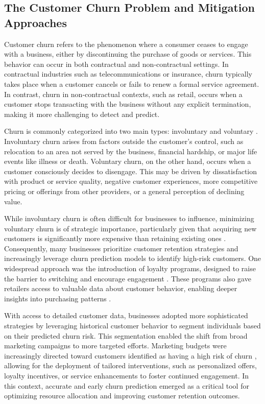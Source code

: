 \documentclass[preprint,12pt]{elsarticle}
\begin{document}
\subsection{The Customer Churn Problem and Mitigation Approaches}

Customer churn refers to the phenomenon where a consumer ceases to engage with a business, either by discontinuing the purchase of goods or services. This behavior can occur in both contractual and non-contractual settings. In contractual industries such as telecommunications or insurance, churn typically takes place when a customer cancels or fails to renew a formal service agreement. In contrast, churn in non-contractual contexts, such as retail, occurs when a customer stops transacting with the business without any explicit termination, making it more challenging to detect and predict.

Churn is commonly categorized into two main types: involuntary and voluntary \cite{park2022not}. Involuntary churn arises from factors outside the customer’s control, such as relocation to an area not served by the business, financial hardship, or major life events like illness or death. Voluntary churn, on the other hand, occurs when a customer consciously decides to disengage. This may be driven by dissatisfaction with product or service quality, negative customer experiences, more competitive pricing or offerings from other providers, or a general perception of declining value.

While involuntary churn is often difficult for businesses to influence, minimizing voluntary churn is of strategic importance, particularly given that acquiring new customers is significantly more expensive than retaining existing ones \cite{ahmad2001customer}. Consequently, many businesses prioritize customer retention strategies and increasingly leverage churn prediction models to identify high-risk customers. One widespread approach was the introduction of loyalty programs, designed to raise the barrier to switching and encourage engagement \cite{lewis2004influence}. These programs also gave retailers access to valuable data about customer behavior, enabling deeper insights into purchasing patterns \cite{stourm2020refocusing}.

With access to detailed customer data, businesses adopted more sophisticated strategies by leveraging historical customer behavior to segment individuals based on their predicted churn risk. This segmentation enabled the shift from broad marketing campaigns to more targeted efforts. Marketing budgets were increasingly directed toward customers identified as having a high risk of churn \cite{lemmens2020managing}, allowing for the deployment of tailored interventions, such as personalized offers, loyalty incentives, or service enhancements to foster continued engagement. In this context, accurate and early churn prediction emerged as a critical tool for optimizing resource allocation and improving customer retention outcomes.
\end{document}

